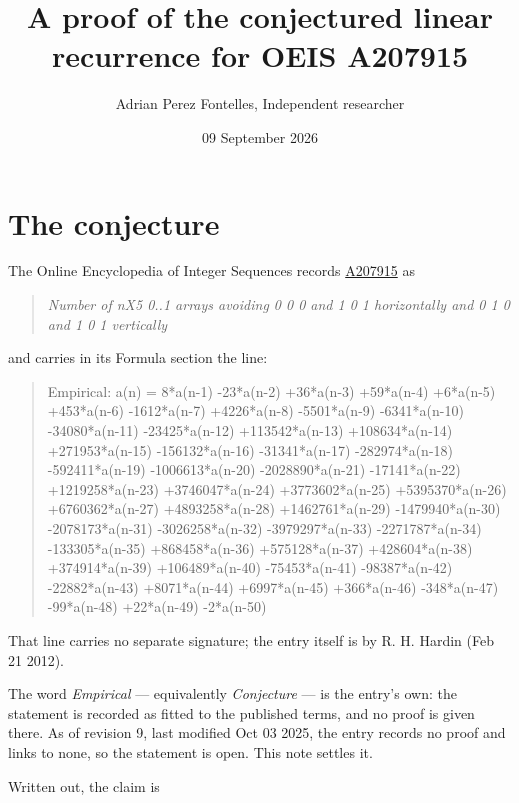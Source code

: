 \documentclass[11pt]{article}
\title{A proof of the conjectured linear recurrence for OEIS A207915}
\author{Adrian Perez Fontelles, Independent researcher}
\date{09 September 2026}
\theoremstyle{definition}
\begin{document}
\maketitle
\section{The conjecture}

The Online Encyclopedia of Integer Sequences records \href{https://oeis.org/A207915}{A207915} as

\begin{quote}\itshape Number of nX5 0..1 arrays avoiding 0 0 0 and 1 0 1 horizontally and 0 1 0 and 1 0 1 vertically\end{quote}

and carries in its Formula section the line:

\begin{quote}\ttfamily Empirical: a(n) = 8*a(n-1) -23*a(n-2) +36*a(n-3) +59*a(n-4) +6*a(n-5) +453*a(n-6) -1612*a(n-7) +4226*a(n-8) -5501*a(n-9) -6341*a(n-10) -34080*a(n-11) -23425*a(n-12) +113542*a(n-13) +108634*a(n-14) +271953*a(n-15) -156132*a(n-16) -31341*a(n-17) -282974*a(n-18) -592411*a(n-19) -1006613*a(n-20) -2028890*a(n-21) -17141*a(n-22) +1219258*a(n-23) +3746047*a(n-24) +3773602*a(n-25) +5395370*a(n-26) +6760362*a(n-27) +4893258*a(n-28) +1462761*a(n-29) -1479940*a(n-30) -2078173*a(n-31) -3026258*a(n-32) -3979297*a(n-33) -2271787*a(n-34) -133305*a(n-35) +868458*a(n-36) +575128*a(n-37) +428604*a(n-38) +374914*a(n-39) +106489*a(n-40) -75453*a(n-41) -98387*a(n-42) -22882*a(n-43) +8071*a(n-44) +6997*a(n-45) +366*a(n-46) -348*a(n-47) -99*a(n-48) +22*a(n-49) -2*a(n-50)\end{quote}

That line carries no separate signature; the entry itself is by R. H. Hardin (Feb 21 2012).

The word {\itshape Empirical} --- equivalently {\itshape Conjecture} --- is the entry's own: the statement is recorded as fitted to the published terms, and no proof is given there. As of revision 9, last modified Oct 03 2025, the entry records no proof and links to none, so the statement is open. This note settles it.

Written out, the claim is
\end{document}
